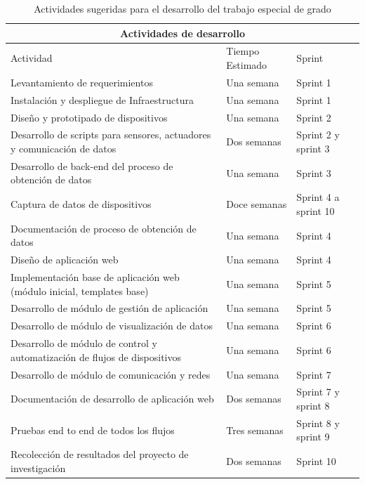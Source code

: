 \begin{table}[!htb]
\centering
\begin{tabular}{| m{6.5cm}| m{3.5cm}| m{4cm}|}
\hline
\multicolumn{3}{|c|}{Actividades de desarrollo} \\
\hline 
\centering Actividad & \centering Tiempo Estimado & \centering Sprint \tabularnewline \hline

Levantamiento de requerimientos & Una semana & Sprint 1 \\ \hline

Instalación y despliegue de Infraestructura & Una semana & Sprint 1 \\ \hline

Diseño y prototipado de dispositivos & Una semana & Sprint 2 \\ \hline

Desarrollo de scripts para sensores, actuadores y comunicación de datos & Dos semanas & Sprint 2 y sprint 3\\ \hline

Desarrollo de back-end del proceso de obtención de datos & Una semana & Sprint 3  \\ \hline

Captura de datos de dispositivos & Doce semanas & Sprint 4 a sprint 10 \\ \hline

Documentación de proceso de obtención de datos & Una semana & Sprint 4 \\ \hline

Diseño de aplicación web & Una semana & Sprint 4 \\ \hline

Implementación base de aplicación web (módulo inicial, templates base) & Una semana & Sprint 5 \\ \hline

Desarrollo de módulo de gestión de aplicación & Una semana & Sprint 5 \\ \hline

Desarrollo de módulo de visualización de datos & Una semana & Sprint 6\\ \hline

Desarrollo de módulo de control y automatización de flujos de dispositivos & Una semana & Sprint 6\\ \hline

Desarrollo de módulo de comunicación y redes & Una semana & Sprint 7\\ \hline

Documentación de desarrollo de aplicación web & Dos semanas & Sprint 7 y sprint 8\\ \hline

Pruebas end to end de todos los flujos & Tres semanas & Sprint 8 y sprint 9\\ \hline

Recolección de resultados del proyecto de investigación & Dos semanas & Sprint 10\\ \hline

\end{tabular}
\caption{Actividades sugeridas para el desarrollo del trabajo especial de grado}
\label{tabla:actividades_desarrollo}
\end{table}
 